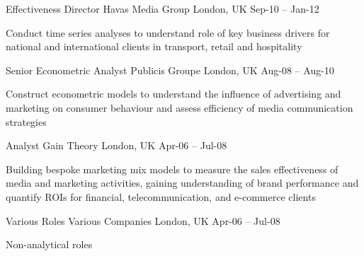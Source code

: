 \begin{cventries}
  \cventry
    {Effectiveness Director} %
    {Havas Media Group} %
    {London, UK} %
    {Sep-10 – Jan-12} %
    {
      \begin{cvitems} %
        \item {Conduct time series analyses to understand role of key business drivers for national and international clients in transport, retail and hospitality}
      \end{cvitems}
    }

  \cventry
    {Senior Econometric Analyst} %
    {Publicis Groupe} %
    {London, UK} %
    {Aug-08 – Aug-10} %
    {
      \begin{cvitems} %
        \item {Construct econometric models to understand the influence of advertising and marketing on consumer behaviour and assess efficiency of media communication strategies}
      \end{cvitems}
    }

  \cventry
    {Analyst} %
    {Gain Theory} %
    {London, UK} %
    {Apr-06 – Jul-08} %
    {
      \begin{cvitems} %
        \item {Building bespoke marketing mix models to measure the sales effectiveness of media and marketing activities, gaining understanding of brand performance and quantify ROIs for financial, telecommunication, and e-commerce clients}
      \end{cvitems}
    }
    
  \cventry
    {Various Roles} %
    {Various Companies} %
    {London, UK} %
    {Apr-06 – Jul-08} %
    {
      \begin{cvitems} %
        \item {Non-analytical roles}
      \end{cvitems}
    }

\end{cventries}
